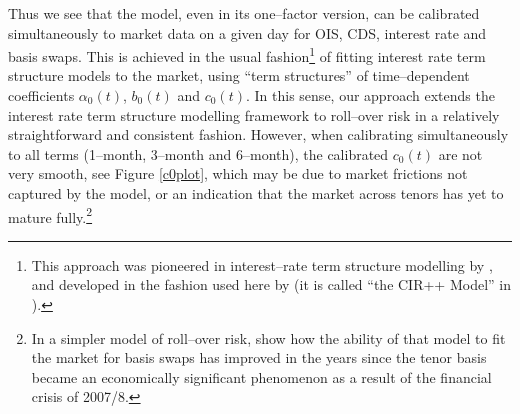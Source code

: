 \documentclass[12pt,a4paper]{article}
\theoremstyle{plain}
\numberwithin{equation}{section}
\begin{document}
Thus we see that the model, even in its one--factor version, can be calibrated simultaneously to market data on a given day for OIS, CDS, interest rate and basis swaps. This is achieved in the usual fashion\footnote{This approach was pioneered in interest--rate term structure modelling by , and developed in the fashion used here by  (it is called ``the CIR++ Model'' in ).} of fitting interest rate term structure models to the market, using ``term structures'' of time--dependent coefficients $\alpha_0(t)$, $b_0(t)$ and $c_0(t)$. In this sense, our approach extends the interest rate term structure modelling framework to roll--over risk in a relatively straightforward and consistent fashion. However, when calibrating simultaneously to all terms (1--month, 3--month and 6--month), the calibrated $c_0(t)$ are not very smooth, see Figure \ref{c0plot}, which may be due to market frictions not captured by the model, or an indication that the market across tenors has yet to mature fully.\footnote{In a simpler model of roll--over risk,  show how the ability of that model to fit the market for basis swaps has improved in the years since the tenor basis became an economically significant phenomenon as a result of the financial crisis of 2007/8.}
\end{document}
